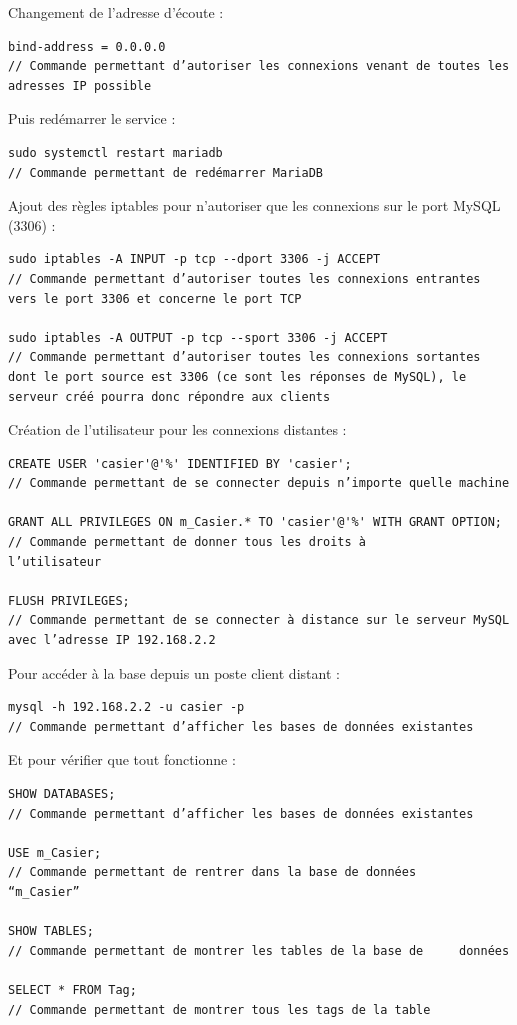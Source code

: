 \documentclass[main.tex]{subfiles}
\begin{document}
Changement de l’adresse d’écoute :

\begin{lstlisting}
bind-address = 0.0.0.0
// Commande permettant d’autoriser les connexions venant de toutes les adresses IP possible
\end{lstlisting}

Puis redémarrer le service :

\begin{lstlisting}
sudo systemctl restart mariadb
// Commande permettant de redémarrer MariaDB
\end{lstlisting}

Ajout des règles iptables pour n'autoriser que les connexions sur le port MySQL (3306) :

\begin{lstlisting}
sudo iptables -A INPUT -p tcp --dport 3306 -j ACCEPT
// Commande permettant d’autoriser toutes les connexions entrantes vers le port 3306 et concerne le port TCP

sudo iptables -A OUTPUT -p tcp --sport 3306 -j ACCEPT
// Commande permettant d’autoriser toutes les connexions sortantes dont le port source est 3306 (ce sont les réponses de MySQL), le serveur créé pourra donc répondre aux clients
\end{lstlisting}

Création de l’utilisateur pour les connexions distantes :

\begin{lstlisting}
CREATE USER 'casier'@'%' IDENTIFIED BY 'casier';
// Commande permettant de se connecter depuis n’importe quelle machine

GRANT ALL PRIVILEGES ON m_Casier.* TO 'casier'@'%' WITH GRANT OPTION;
// Commande permettant de donner tous les droits à             l’utilisateur

FLUSH PRIVILEGES;
// Commande permettant de se connecter à distance sur le serveur MySQL avec l’adresse IP 192.168.2.2

\end{lstlisting}

Pour accéder à la base depuis un poste client distant :

\begin{lstlisting}
mysql -h 192.168.2.2 -u casier -p
// Commande permettant d’afficher les bases de données existantes
\end{lstlisting}

Et pour vérifier que tout fonctionne :

\begin{lstlisting}
SHOW DATABASES;
// Commande permettant d’afficher les bases de données existantes

USE m_Casier;
// Commande permettant de rentrer dans la base de données
“m_Casier”

SHOW TABLES;
// Commande permettant de montrer les tables de la base de     données

SELECT * FROM Tag;
// Commande permettant de montrer tous les tags de la table
\end{lstlisting}
\end{document}

